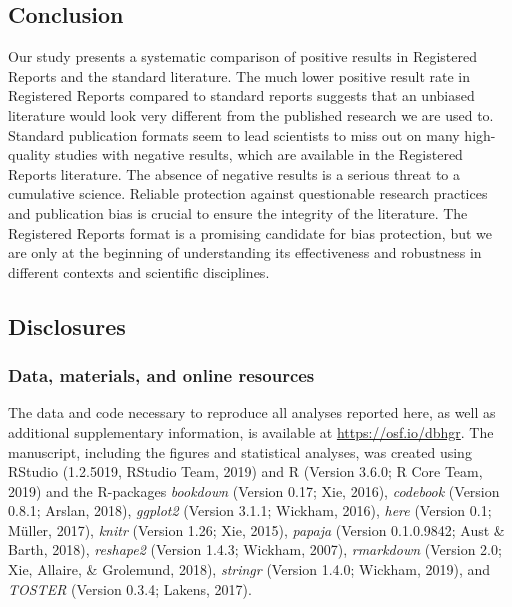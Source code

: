 \documentclass[british,,man,floatsintext]{apa6}
\begin{document}
\hypertarget{conclusion}{%
\subsection{Conclusion}\label{conclusion}}

Our study presents a systematic comparison of positive results in Registered Reports and the standard literature.
The much lower positive result rate in Registered Reports compared to standard reports suggests that an unbiased literature would look very different from the published research we are used to.
Standard publication formats seem to lead scientists to miss out on many high-quality studies with negative results, which are available in the Registered Reports literature.
The absence of negative results is a serious threat to a cumulative science.
Reliable protection against questionable research practices and publication bias is crucial to ensure the integrity of the literature.
The Registered Reports format is a promising candidate for bias protection, but we are only at the beginning of understanding its effectiveness and robustness in different contexts and scientific disciplines.

\hypertarget{disclosures}{%
\subsection{Disclosures}\label{disclosures}}

\hypertarget{data-materials-and-online-resources}{%
\subsubsection{Data, materials, and online resources}\label{data-materials-and-online-resources}}

The data and code necessary to reproduce all analyses reported here, as well as additional supplementary information, is available at \url{https://osf.io/dbhgr}. The manuscript, including the figures and statistical analyses, was created using RStudio (1.2.5019, RStudio Team, 2019) and R (Version 3.6.0; R Core Team, 2019) and the R-packages \emph{bookdown} (Version 0.17; Xie, 2016), \emph{codebook} (Version 0.8.1; Arslan, 2018), \emph{ggplot2} (Version 3.1.1; Wickham, 2016), \emph{here} (Version 0.1; Müller, 2017), \emph{knitr} (Version 1.26; Xie, 2015), \emph{papaja} (Version 0.1.0.9842; Aust \& Barth, 2018), \emph{reshape2} (Version 1.4.3; Wickham, 2007), \emph{rmarkdown} (Version 2.0; Xie, Allaire, \& Grolemund, 2018), \emph{stringr} (Version 1.4.0; Wickham, 2019), and \emph{TOSTER} (Version 0.3.4; Lakens, 2017).
\end{document}
